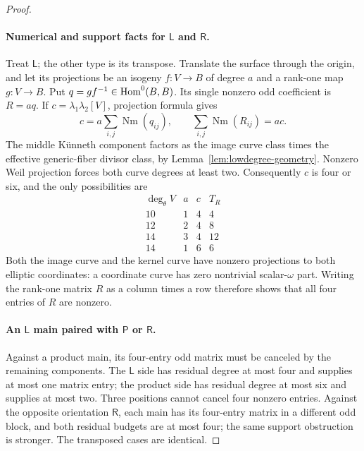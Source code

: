 \begin{proof}
\paragraph{Numerical and support facts for $\mathsf L$ and $\mathsf R$.}
Treat $\mathsf L$; the other type is its transpose. Translate the
surface through the origin, and let its projections be an isogeny
$f:V\to B$ of degree $a$ and a rank-one map $g:V\to B$. Put
$q=g f^{-1}\in\operatorname{Hom}^0(B,B)$. Its single nonzero odd coefficient is
$R=a q$. If $c=\lambda_1\lambda_2[V]$, projection formula gives
\[
 c=a\sum_{i,j}\operatorname{Nm}(q_{ij}),\qquad
 \sum_{i,j}\operatorname{Nm}(R_{ij})=ac.
\]
The middle K\"unneth component factors as the image curve class
times the effective generic-fiber divisor class, by
Lemma~\ref{lem:lowdegree-geometry}.
Nonzero Weil projection forces both curve degrees at least two.
Consequently $c$ is four or six, and the only possibilities are
\[
\begin{array}{c|c|c|c}
 \deg_\theta V&a&c&T_R\\ \hline
 10&1&4&4\\
 12&2&4&8\\
 14&3&4&12\\
 14&1&6&6
\end{array}
\]
Both the image curve and the kernel curve have nonzero projections to
both elliptic coordinates: a coordinate curve has zero nontrivial
scalar-$\omega$ part. Writing the rank-one matrix $R$ as a column
times a row therefore shows that all four entries of $R$ are nonzero.

\paragraph{An $\mathsf L$ main paired with $\mathsf P$ or $\mathsf R$.}
Against a product main, its four-entry odd matrix must be canceled
by the remaining components. The $\mathsf L$ side has residual degree
at most four and supplies at most one matrix entry; the product side
has residual degree at most six and supplies at most two. Three
positions cannot cancel four nonzero entries. Against the opposite
orientation $\mathsf R$, each main has its four-entry matrix in a
different odd block, and both residual budgets are at most four;
the same support obstruction is stronger. The transposed cases are
identical.


\end{proof}
